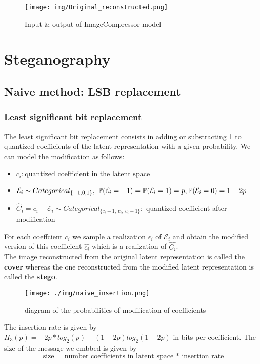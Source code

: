 \documentclass[12pt]{article}
\begin{document}
\begin{figure}[H]
    \centering
    \texttt{[image: img/Original\_reconstructed.png]}
    \caption[short]{Input \& output of ImageCompressor model}
\end{figure}

\section{Steganography}
\subsection{Naive method: LSB replacement}
\subsubsection{Least significant bit replacement}
The least significant bit replacement consists in adding or substracting 1 to quantized coefficients of the latent representation with a given probability. We can model the modification as follows:

\begin{itemize}
    \item $c_i: \text{quantized coefficient in the latent space}$
    \item $\mathcal{E}
    _i \sim Categorical_{\{-1,0,1\}},\\
    \ \mathbb{P}(\mathcal{E}_i = -1) = \mathbb{P}(\mathcal{E}_i = 1) = p,\\
    \mathbb{P}(\mathcal{E}_i = 0) = 1-2p$ 
    \item $\hat{C}_i = c_i + \mathcal{E}_i \sim Categorical_{\{c_i-1,\ c_i,\ c_i+1\}}:$ quantized coefficient after modification
\end{itemize}

For each coeffcient $c_i$ we sample a realization $\epsilon_i$ of $\mathcal{E}_i$ and obtain the modified version of this coefficient $\hat{c_i}$ which is a realization of $\hat{C_i}$.\\
The image reconstructed from the original latent representation is called the \textbf{cover} whereas the one reconstructed from the modified latent representation is called the \textbf{stego}.

\begin{figure}[H]
    \centering
    \texttt{[image: ./img/naive\_insertion.png]}
    \caption[short]{diagram of the probabilities of modification of coefficients}
    \label{fig:probabilities}
\end{figure}
The insertion rate is given by $H_3(p) = -2p*log_2(p) - (1-2p)log_2(1-2p)$ in bits per coefficient. The size of the message we embbed is given by \[\text{size = number coefficients in latent space * insertion rate}\]
\end{document}
